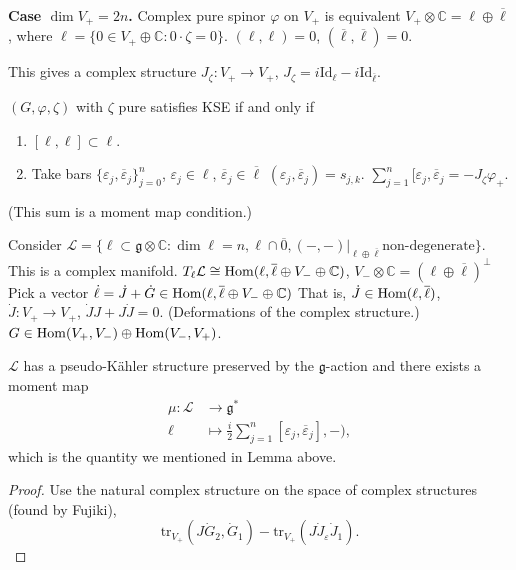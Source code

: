 \medskip\noindent
{\bf Case $\dim V_+=2n$.}
Complex pure spinor $\varphi$ on $V_+$ is
equivalent $V_+ \otimes \mathbb{C}=\ell \oplus \overline{\ell}$,
where $\ell=\{0 \in V_+ \oplus \mathbb{C}:0 \cdot\zeta=0\}$.
$(\ell,\ell)=0$, $(\overline{\ell},\overline{\ell})=0$.

This gives a complex structure
$J_\zeta:V_+ \to V_+$, $J_\zeta=i \text{Id}_\ell-i \text{Id}_{\overline{\ell}}$.

\begin{lemma}
\label{lemma-solutions-KSE}
$(G,\varphi,\zeta)$ with $\zeta$ pure satisfies KSE if and only if
\begin{enumerate}
\item $[\ell,\ell]\subset \ell$.
\item Take bars $\{\varepsilon_j,\overline{\varepsilon}_j\}^n_{j=0}$,
$\varepsilon_j \in \ell$, $\overline{\varepsilon}_j\in \overline{\ell}$
$(\varepsilon_j,\overline{\varepsilon}_j) = s_{j,k}$.
$\sum_{j=1}^n[\varepsilon_j,\overline{\varepsilon}_j=-J_\zeta \varphi_+$.
\end{enumerate}
\end{lemma}
(This sum is a moment map condition.)

Consider $\mathcal{L}=\{\ell \subset \mathfrak{g} \otimes \mathbb{C}:
\dim\ell=n,\ell\cap\overline{0},(-,-)|_{\ell \oplus \overline{\ell}}
\text{non-degenerate}\}$.
This is a complex manifold.
$T_\ell \mathcal{L} 
\cong \mathop{\mathrm{Hom}}\nolimits(\ell,\overline{\ell}\oplus V_- \oplus \mathbb{C})$,
$V_- \otimes \mathbb{C}=(\ell \oplus \overline{\ell})^\perp$
Pick a vector $\dot \ell = \dot J + \dot G \in 
\mathop{\mathrm{Hom}}\nolimits(\ell,\overline{\ell}\oplus V_- \oplus \mathbb{C})$
That is, $\dot J \in \mathop{\mathrm{Hom}}\nolimits(\ell, \overline{\ell})$,
$\dot J :V_+ \to V_+$,
$\dot J J+ J \dot J=0$. (Deformations of the complex structure.)
$G \in \mathop{\mathrm{Hom}}\nolimits(V_+,V_-) \oplus \mathop{\mathrm{Hom}}\nolimits(V_-,V_+)$.

\begin{proposition}[Romero]
\label{proposition-Romero}
$\mathcal{L}$ has a pseudo-Kähler structure
preserved by the $\mathfrak{g}$-action and there exists
a moment map
\begin{align*}
\mu: \mathcal{L} &\longrightarrow \mathfrak{g}^* \\
\ell &\longmapsto
\frac{i}{2}\sum_{j=1}^n[\varepsilon_j,\overline{\varepsilon}_j],-),
\end{align*}
which is the quantity we mentioned in Lemma above.
\end{proposition}

\begin{proof}
Use the natural complex structure on the space of complex structures
(found by Fujiki),
$$
\text{tr}_{V_+}(J \dot G_2,\dot G_1)-\text{tr}_{V_+}(J \dot J_{\varepsilon}
\dot J_1).
$$ 
\end{proof}


